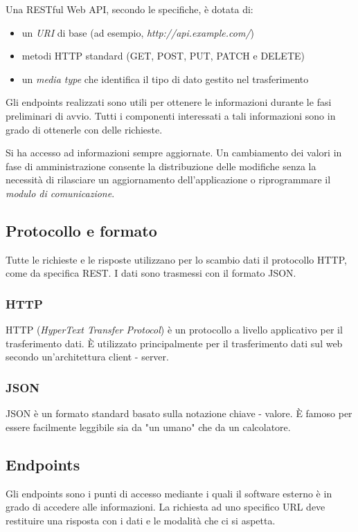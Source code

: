 Una RESTful Web API, secondo le specifiche, è dotata di:
\begin{itemize}
    \item un \textit{URI} di base (ad esempio, \textit{http://api.example.com/})
    \item metodi HTTP standard (GET, POST, PUT, PATCH e DELETE)
    \item un \textit{media type} che identifica il tipo di dato gestito nel trasferimento 
\end{itemize}

\noindent Gli endpoints realizzati sono utili per ottenere le informazioni durante le fasi preliminari di avvio.
Tutti i componenti interessati a tali informazioni sono in grado di ottenerle con delle richieste.

Si ha accesso ad informazioni sempre aggiornate. Un cambiamento dei valori in fase di amministrazione consente la 
distribuzione delle modifiche senza la necessità di rilasciare un aggiornamento dell'applicazione o riprogrammare il 
\textit{modulo di comunicazione}.


\subsection{Protocollo e formato}
Tutte le richieste e le risposte utilizzano per lo scambio dati il protocollo HTTP, come da specifica REST.
I dati sono trasmessi con il formato JSON.

\subsubsection{HTTP}
HTTP (\textit{HyperText Transfer Protocol}) è un protocollo a livello applicativo per il trasferimento dati. È utilizzato principalmente 
per il trasferimento dati sul web secondo un'architettura client - server.

\subsubsection{JSON}
JSON \cite{json} è un formato standard basato sulla notazione chiave - valore. È famoso per essere facilmente 
leggibile sia da "un umano" che da un calcolatore.



\subsection{Endpoints}
Gli endpoints sono i punti di accesso mediante i quali il software esterno 
è in grado di accedere alle informazioni. La richiesta ad uno specifico URL 
deve restituire una risposta con i dati e le modalità che ci si aspetta.

